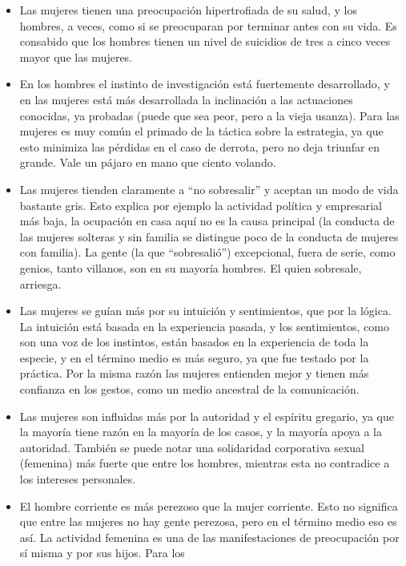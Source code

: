 \begin{itemize}

\item
  Las mujeres tienen una preocupación hipertrofiada de su salud, y los
  hombres, a veces, como si se preocuparan por terminar antes con su
  vida. Es consabido que los hombres tienen un nivel de suicidios de
  tres a cinco veces mayor que las mujeres.
\item
  En los hombres el instinto de investigación está fuertemente
  desarrollado, y en las mujeres está más desarrollada la inclinación a
  las actuaciones conocidas, ya probadas (puede que sea peor, pero a la
  vieja usanza). Para las mujeres es muy común el primado de la táctica
  sobre la estrategia, ya que esto minimiza las pérdidas en el caso de
  derrota, pero no deja triunfar en grande. Vale un pájaro en mano que
  ciento volando.
\item
  Las mujeres tienden claramente a ``no sobresalir'' y aceptan un modo
  de vida bastante gris. Esto explica por ejemplo la actividad política
  y empresarial más baja, la ocupación en casa aquí no es la causa
  principal (la conducta de las mujeres solteras y sin familia se
  distingue poco de la conducta de mujeres con familia). La gente (la
  que ``sobresalió'') excepcional, fuera de serie, como genios, tanto
  villanos, son en su mayoría hombres. El quien sobresale, arriesga.
\item
  Las mujeres se guían más por su intuición y sentimientos, que por la
  lógica. La intuición está basada en la experiencia pasada, y los
  sentimientos, como son una voz de los instintos, están basados en la
  experiencia de toda la especie, y en el término medio es más seguro,
  ya que fue testado por la práctica. Por la misma razón las mujeres
  entienden mejor y tienen más confianza en los gestos, como un medio
  ancestral de la comunicación.
\item
  Las mujeres son influidas más por la autoridad y el espíritu gregario,
  ya que la mayoría tiene razón en la mayoría de los casos, y la mayoría
  apoya a la autoridad. También se puede notar una solidaridad
  corporativa sexual (femenina) más fuerte que entre los hombres,
  mientras esta no contradice a los intereses personales.
\item
  El hombre corriente es más perezoso que la mujer corriente. Esto no
  significa que entre las mujeres no hay gente perezosa, pero en el
  término medio eso es así. La actividad femenina es una de las
  manifestaciones de preocupación por sí misma y por sus hijos. Para los

\end{itemize}
